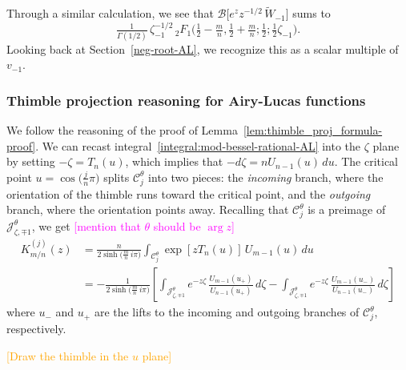 \documentclass{article}
\newcommand{\borel}{\mathcal{B}}
\theoremstyle{definition}
\theoremstyle{plain}
\begin{document}
Through a similar calculation, we see that $\borel\big[ e^z z^{-1/2}\,\tilde{W}_{-1} \big]$ sums to
\[ \tfrac{1}{\Gamma(1/2)}\,\zeta_{-1}^{-1/2}\,{}_2F_1\big(\tfrac{1}{2}-\tfrac{m}{n}, \tfrac{1}{2}+\tfrac{m}{n}; \tfrac{1}{2}; \tfrac{1}{2}\zeta_{-1}\big). \]
Looking back at Section~\ref{neg-root-AL}, we recognize this as a scalar multiple of $v_{-1}$.



\subsubsection{Thimble projection reasoning for Airy-Lucas functions}\label{contour-argument-AL}
We follow the reasoning of the proof of Lemma~\ref{lem:thimble_proj_formula-proof}. We can recast integral~\eqref{integral:mod-bessel-rational-AL} into the $\zeta$ plane by setting $-\zeta = T_n(u)$, which implies that $-d\zeta = n U_{n-1}(u)\,du$. The critical point $u = \cos\big(\tfrac{j}{n}\pi\big)$ splits $\mathcal{C}^\theta_j$ into two pieces: the {\em incoming} branch, where the orientation of the thimble runs toward the critical point, and the {\em outgoing} branch, where the orientation points away. Recalling that $\mathcal{C}^\theta_j$ is a preimage of $\mathcal{J}^\theta_{\zeta, \mp 1}$, we get \textcolor{magenta}{[mention that $\theta$ should be $\arg z$]}
\begin{align*}%
K^{(j)}_{m/n}(z) & = \frac{n}{2 \sinh\big(\tfrac{m}{n}\,i\pi\big)} \int_{\mathcal{C}^\theta_j} \exp\left[z T_n(u)\right]\,U_{m-1}(u)\,du \\
& = -\frac{1}{2\sinh\big(\tfrac{m}{n}\,i\pi\big)} \left[ \int_{\mathcal{J}^\theta_{\zeta, \mp 1}} e^{-z\zeta}\,\frac{U_{m-1}(u_+)}{U_{n-1}(u_+)}\,d\zeta - \int_{\mathcal{J}^\theta_{\zeta, \mp 1}} e^{-z\zeta}\,\frac{U_{m-1}(u_-)}{U_{n-1}(u_-)}\,d\zeta \right]
\end{align*}
where $u_-$ and $u_+$ are the lifts to the incoming and outgoing branches of $\mathcal{C}^\theta_j$, respectively.
\begin{center}
\textcolor{orange}{[Draw the thimble in the $u$ plane]}
\end{center}
\end{document}
